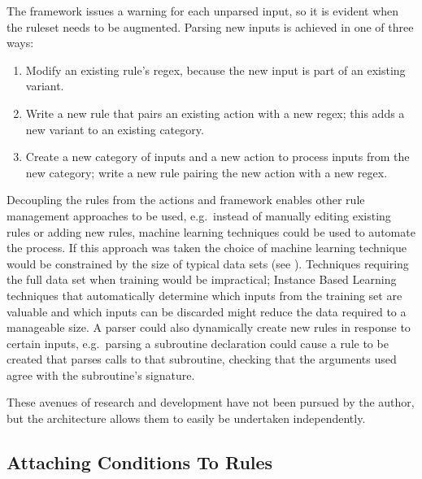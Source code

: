 The framework issues a warning for each unparsed input, so it is evident
when the ruleset needs to be augmented.  Parsing new inputs is achieved in
one of three ways:

\begin{enumerate}

    \item Modify an existing rule's regex, because the new input is part of
        an existing variant.

    \item Write a new rule that pairs an existing action with a new regex;
        this adds a new variant to an existing category.

    \item Create a new category of inputs and a new action to process
        inputs from the new category; write a new rule pairing the new
        action with a new regex.

\end{enumerate}

Decoupling the rules from the actions and framework enables other rule
management approaches to be used, e.g.\ instead of manually editing
existing rules or adding new rules, machine learning techniques could be
used to automate the process.  If this approach was taken the choice of
machine learning technique would be constrained by the size of typical data
sets (see ).  Techniques requiring the full
data set when training would be impractical; Instance Based
Learning~\cite{instance-based-learning} techniques that automatically
determine which inputs from the training set are valuable and which inputs
can be discarded might reduce the data required to a manageable size.  A
parser could also dynamically create new rules in response to certain
inputs, e.g.\ parsing a subroutine declaration could cause a rule to be
created that parses calls to that subroutine, checking that the arguments
used agree with the subroutine's signature.

These avenues of research and development have not been pursued by the
author, but the architecture allows them to easily be undertaken
independently.

\subsection{Attaching Conditions To Rules}

\label{attaching conditions to rules}

